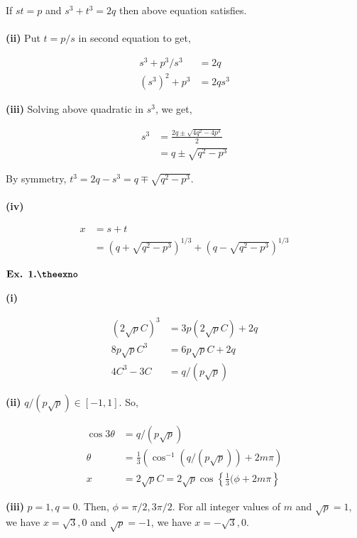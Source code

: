\documentclass{article}
\def\tf{\textbf}
\newcounter{exno}
\begin{document}
If $st=p$ and $s^3+t^3=2q$ then above equation satisfies.\\~\\

\tf{(ii)} Put $t=p/s$ in second equation to get,

\begin{align*}
    s^3 + p^3/s^3 &= 2q\\
    (s^3)^2 + p^3 &= 2qs^3
\end{align*}

\tf{(iii)} Solving above quadratic in $s^3$, we get,

\begin{align*}
    s^3 &= \frac{2q \pm \sqrt{4q^2 - 4p^3}}{2}\\
    &= q \pm \sqrt{q^2-p^3}
\end{align*}

By symmetry, $t^3 = 2q-s^3 = q \mp \sqrt{q^2-p^3}$.\\~\\

\tf{(iv)} 

\begin{align*}
    x &= s+t\\
    &= (q + \sqrt{q^2-p^3})^{1/3} + (q - \sqrt{q^2-p^3})^{1/3} 
\end{align*}

\vspace{0.2in}

${\textbf{Ex. 1.\theexno}}$
\addtocounter{exno}{1}

\tf{(i)}

\begin{align*}
    (2\sqrt{p}C)^3 &= 3p(2\sqrt{p}C) + 2q\\
    8p\sqrt{p}C^3 &= 6p\sqrt{p}C + 2q\\
    4C^3 - 3C &= q/(p\sqrt{p})
\end{align*}

\tf{(ii)} $q/(p\sqrt{p}) \in [-1,1]$. So,

\begin{align*}
    \cos 3\theta &= q/(p\sqrt{p})\\
    \theta &= \frac{1}{3}(\cos^{-1}(q/(p\sqrt{p})) + 2m\pi)\\
    x &= 2\sqrt{p}C = 2\sqrt{p}\cos\left\{\frac{1}{3}(\phi + 2m\pi \right\}
\end{align*}

\tf{(iii)} $p=1, q=0$. Then, $\phi = \pi/2, 3\pi/2$. For all integer values of $m$ and $\sqrt{p}=1$, we have $x=\sqrt{3}, 0$ and $\sqrt{p}=-1$, we have $x=-\sqrt{3},0$.
\end{document}

